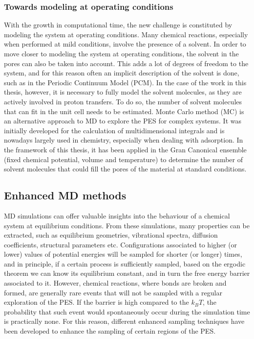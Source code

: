 \subsubsection*{Towards modeling at operating conditions}
With the growth in computational time, the new challenge is constituted by modeling the system at operating conditions. Many chemical reactions, especially when performed at mild conditions, involve the presence of a solvent. In order to move closer to modeling the system at operating conditions, the solvent in the pores can also be taken into account. This adds a lot of degrees of freedom to the system, and for this reason often an implicit description of the solvent is done, such as in the Periodic Continuum Model (PCM). In the case of the work in this thesis, however, it is necessary to fully model the solvent molecules, as they are actively involved in proton transfers. 
To do so, the number of solvent molecules that can fit in the unit cell needs to be estimated. Monte Carlo method (MC) is an alternative approach to MD to explore the PES for complex systems. It was initially developed for the calculation of multidimensional integrals and is nowadays largely used in chemistry, especially when dealing with adsorption. In the framework of this thesis, it has been applied in the Gran Canonical ensemble (fixed chemical potential, volume and temperature) to determine the number of solvent molecules that could fill the pores of the material at standard conditions.

\subsection*{Enhanced MD methods}
MD simulations can offer valuable insights into the behaviour of a chemical system at equilibrium conditions. From these simulations, many properties can be extracted, such as equilibrium geometries, vibrational spectra, diffusion coefficients, structural parameters etc. Configurations associated to higher (or lower) values of potential energies will be sampled for shorter (or longer) times, and in principle, if a certain process is sufficiently sampled, based on the ergodic theorem we can know its equilibrium constant, and in turn the free energy barrier associated to it. However, chemical reactions, where bonds are broken and formed, are generally rare events that will not be sampled with a regular exploration of the PES. If the barrier is high compared to the $k_{B}T$, the probability that such event would spontaneously occur during the simulation time is practically none. For this reason, different enhanced sampling techniques have been developed to enhance the sampling of certain regions of the PES. 


